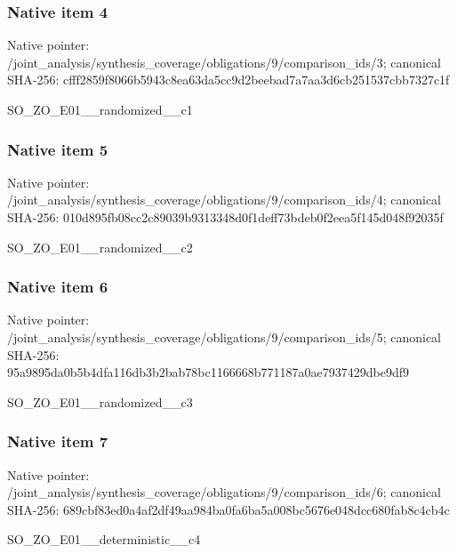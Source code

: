 \documentclass[10pt,a4paper]{article}
\begin{document}
\subsubsection{Native item 4}
Native pointer: /joint\_\allowbreak{}analysis/synthesis\_\allowbreak{}coverage/obligations/9/comparison\_\allowbreak{}ids/3; canonical SHA-256: cfff2859f8066b5943c8ea63da5cc9d2beebad7a7aa3d6cb251537cbb7327c1f

\begingroup\raggedright\sloppy SO\_\allowbreak{}ZO\_\allowbreak{}E01\_\allowbreak{}\_\allowbreak{}randomized\_\allowbreak{}\_\allowbreak{}c1\par\endgroup

\subsubsection{Native item 5}
Native pointer: /joint\_\allowbreak{}analysis/synthesis\_\allowbreak{}coverage/obligations/9/comparison\_\allowbreak{}ids/4; canonical SHA-256: 010d895fb08cc2c89039b9313348d0f1deff73bdeb0f2eea5f145d048f92035f

\begingroup\raggedright\sloppy SO\_\allowbreak{}ZO\_\allowbreak{}E01\_\allowbreak{}\_\allowbreak{}randomized\_\allowbreak{}\_\allowbreak{}c2\par\endgroup

\subsubsection{Native item 6}
Native pointer: /joint\_\allowbreak{}analysis/synthesis\_\allowbreak{}coverage/obligations/9/comparison\_\allowbreak{}ids/5; canonical SHA-256: 95a9895da0b5b4dfa116db3b2bab78bc1166668b771187a0ae7937429dbe9df9

\begingroup\raggedright\sloppy SO\_\allowbreak{}ZO\_\allowbreak{}E01\_\allowbreak{}\_\allowbreak{}randomized\_\allowbreak{}\_\allowbreak{}c3\par\endgroup

\subsubsection{Native item 7}
Native pointer: /joint\_\allowbreak{}analysis/synthesis\_\allowbreak{}coverage/obligations/9/comparison\_\allowbreak{}ids/6; canonical SHA-256: 689cbf83ed0a4af2df49aa984ba0fa6ba5a008bc5676e048dcc680fab8c4cb4c

\begingroup\raggedright\sloppy SO\_\allowbreak{}ZO\_\allowbreak{}E01\_\allowbreak{}\_\allowbreak{}deterministic\_\allowbreak{}\_\allowbreak{}c4\par\endgroup
\end{document}
